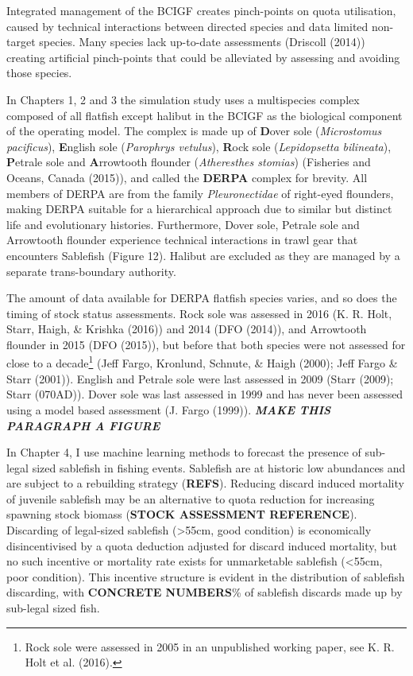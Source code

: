 \documentclass[12pt,]{scrartcl}
\begin{document}
Integrated management of the BCIGF creates pinch-points on quota
utilisation, caused by technical interactions between directed species
and data limited non-target species. Many species lack up-to-date
assessments (Driscoll (2014)) creating artificial pinch-points that
could be alleviated by assessing and avoiding those species.

In Chapters 1, 2 and 3 the simulation study uses a multispecies complex
composed of all flatfish except halibut in the BCIGF as the biological
component of the operating model. The complex is made up of
\textbf{D}over sole (\emph{Microstomus pacificus}), \textbf{E}nglish
sole (\emph{Parophrys vetulus}), \textbf{R}ock sole (\emph{Lepidopsetta
bilineata}), \textbf{P}etrale sole and \textbf{A}rrowtooth flounder
(\emph{Atheresthes stomias}) (Fisheries and Oceans, Canada (2015)), and
called the \textbf{DERPA} complex for brevity. All members of DERPA are
from the family \emph{Pleuronectidae} of right-eyed flounders, making
DERPA suitable for a hierarchical approach due to similar but distinct
life and evolutionary histories. Furthermore, Dover sole, Petrale sole
and Arrowtooth flounder experience technical interactions in trawl gear
that encounters Sablefish (Figure 12). Halibut are excluded as they are
managed by a separate trans-boundary authority.

The amount of data available for DERPA flatfish species varies, and so
does the timing of stock status assessments. Rock sole was assessed in
2016 (K. R. Holt, Starr, Haigh, \& Krishka (2016)) and 2014 (DFO
(2014)), and Arrowtooth flounder in 2015 (DFO (2015)), but before that
both species were not assessed for close to a decade\footnote{Rock sole
  were assessed in 2005 in an unpublished working paper, see K. R. Holt
  et al. (2016).} (Jeff Fargo, Kronlund, Schnute, \& Haigh (2000); Jeff
Fargo \& Starr (2001)). English and Petrale sole were last assessed in
2009 (Starr (2009); Starr (070AD)). Dover sole was last assessed in 1999
and has never been assessed using a model based assessment (J. Fargo
(1999)). \textbf{\emph{MAKE THIS PARAGRAPH A FIGURE}}

In Chapter 4, I use machine learning methods to forecast the presence of
sub-legal sized sablefish in fishing events. Sablefish are at historic
low abundances and are subject to a rebuilding strategy (\textbf{REFS}).
Reducing discard induced mortality of juvenile sablefish may be an
alternative to quota reduction for increasing spawning stock biomass
(\textbf{STOCK ASSESSMENT REFERENCE}). Discarding of legal-sized
sablefish (\textgreater{}55cm, good condition) is economically
disincentivised by a quota deduction adjusted for discard induced
mortality, but no such incentive or mortality rate exists for
unmarketable sablefish (\textless{}55cm, poor condition). This incentive
structure is evident in the distribution of sablefish discarding, with
\textbf{CONCRETE NUMBERS}\% of sablefish discards made up by sub-legal
sized fish.
\end{document}
